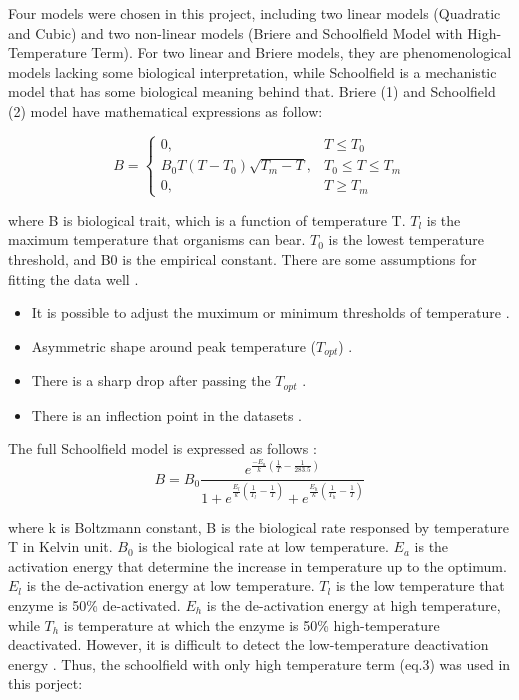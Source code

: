 \documentclass[11pt]{article}
\begin{document}
Four models were chosen in this project, including two linear models (Quadratic and Cubic) and two non-linear models (Briere and Schoolﬁeld Model with High-Temperature Term). For two linear and Briere models, they are phenomenological models lacking some biological interpretation, while Schoolﬁeld is a mechanistic model that has some biological meaning behind that. Briere (1) and Schoolﬁeld (2) model have mathematical expressions as follow:

\begin{equation}
    B =
    \begin{cases}
    0,                           &\text{$T \leq T_0$} \\
    B_0T(T-T_0) \sqrt {T_m - T}, &\text{$T_0 \leq T \leq T_m$} \\
    0,                           &\text{$T \geq T_m$}
    \end{cases}
\end{equation}

where B is biological trait, which is a function of temperature T. $T_l$ is the maximum temperature that organisms can bear.
$T_0$ is the lowest temperature threshold, and B0 is the empirical constant. There are some assumptions for fitting the data well \cite{briere_pracros_1999}.

\begin{itemize}
    \item It is possible to adjust the muximum or minimum thresholds of temperature \cite{briere_pracros_1999}. 
    \item Asymmetric shape around peak temperature ($T_{opt}$) \cite{briere_pracros_1999}.
    \item There is a sharp drop after passing the $T_{opt}$ \cite{briere_pracros_1999}.
    \item There is an inflection point in the datasets \cite{briere_pracros_1999}.
\end{itemize}

The full Schoolfield model is expressed as follows \cite{SCHOOLFIELD1981719}:
\begin{equation}
    B = B_0 \frac { e^{\frac{-E_a}{k}(\frac{1}{T} - \frac{1}{283.5})} }
                { 1 + e^{\frac{E_l}{k}(\frac{1}{T_l} - \frac{1}{T})} + 
                e^{\frac{E_h}{k} (\frac{1}{T_h} - \frac{1}{T}) }}
\end{equation}

where k is Boltzmann constant, B is the biological rate responsed by temperature T in Kelvin unit. $B_0$ is the biological rate at low temperature. $E_a$ is the activation energy that determine the increase in temperature up to the optimum. $E_l$ 
is the de-activation energy at low temperature. $T_l$ is the low temperature that enzyme is 50\% de-activated. $E_h$ is the de-activation energy at high temperature, while $T_h$ is temperature at which the enzyme is 50\% high-temperature deactivated.
However, it is difficult to detect the low-temperature deactivation energy \cite{kontopoulos_2018}. Thus, the schoolfield with only high temperature term (eq.3) was used in this porject:
\end{document}
